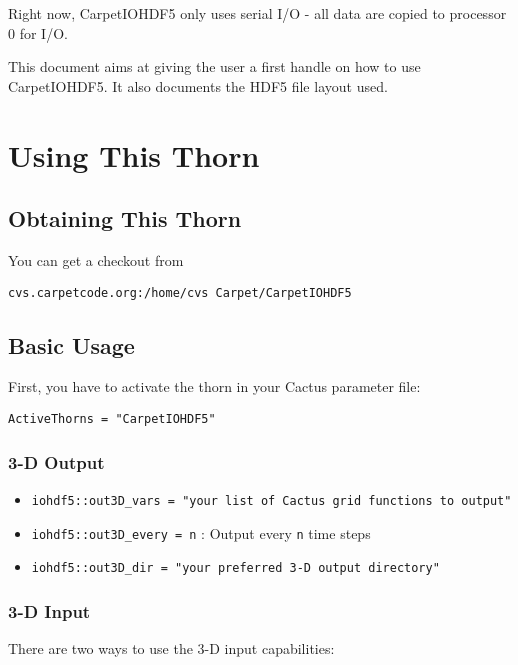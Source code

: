 Right now, CarpetIOHDF5 only uses serial I/O - all data are copied to processor 0 for I/O.

This document aims at giving the user a first handle on how to use
CarpetIOHDF5. It also documents the HDF5 file layout used.


\section{Using This Thorn}


\subsection{Obtaining This Thorn}

You can get a checkout from 

{\tt cvs.carpetcode.org:/home/cvs Carpet/CarpetIOHDF5}

\subsection{Basic Usage}

First, you have to activate the thorn in your Cactus parameter file:

{\tt ActiveThorns = "CarpetIOHDF5"}

\subsubsection{3-D Output}

\begin{itemize}
  \item {\tt iohdf5::out3D\_vars = "your list of Cactus grid functions to output"}
  \item {\tt iohdf5::out3D\_every = n} : Output every {\tt n} time steps
  \item {\tt iohdf5::out3D\_dir = "your preferred 3-D output directory"}
\end{itemize}

\subsubsection{3-D Input}

There are two ways to use the 3-D input capabilities:

